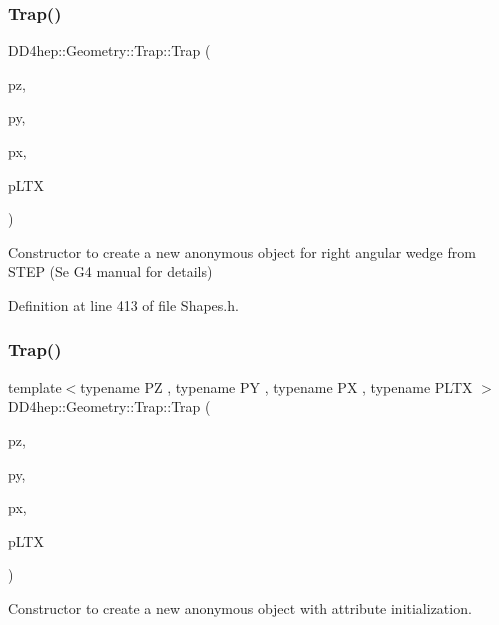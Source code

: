 \subsubsection{\texorpdfstring{Trap()}{Trap()}\hspace{0.1cm}{\footnotesize\ttfamily [6/7]}}
{\footnotesize\ttfamily D\+D4hep\+::\+Geometry\+::\+Trap\+::\+Trap (\begin{DoxyParamCaption}\item[{double}]{pz,  }\item[{double}]{py,  }\item[{double}]{px,  }\item[{double}]{p\+L\+TX }\end{DoxyParamCaption})\hspace{0.3cm}{\ttfamily [inline]}}



Constructor to create a new anonymous object for right angular wedge from S\+T\+EP (Se G4 manual for details) 



Definition at line 413 of file Shapes.\+h.

\hypertarget{class_d_d4hep_1_1_geometry_1_1_trap_a4382006678f47fd85576c9d9f52c50f8}{}\label{class_d_d4hep_1_1_geometry_1_1_trap_a4382006678f47fd85576c9d9f52c50f8} 
\subsubsection{\texorpdfstring{Trap()}{Trap()}\hspace{0.1cm}{\footnotesize\ttfamily [7/7]}}
{\footnotesize\ttfamily template$<$typename PZ , typename PY , typename PX , typename P\+L\+TX $>$ \\
D\+D4hep\+::\+Geometry\+::\+Trap\+::\+Trap (\begin{DoxyParamCaption}\item[{PZ}]{pz,  }\item[{PY}]{py,  }\item[{PX}]{px,  }\item[{P\+L\+TX}]{p\+L\+TX }\end{DoxyParamCaption})\hspace{0.3cm}{\ttfamily [inline]}}



Constructor to create a new anonymous object with attribute initialization. 



